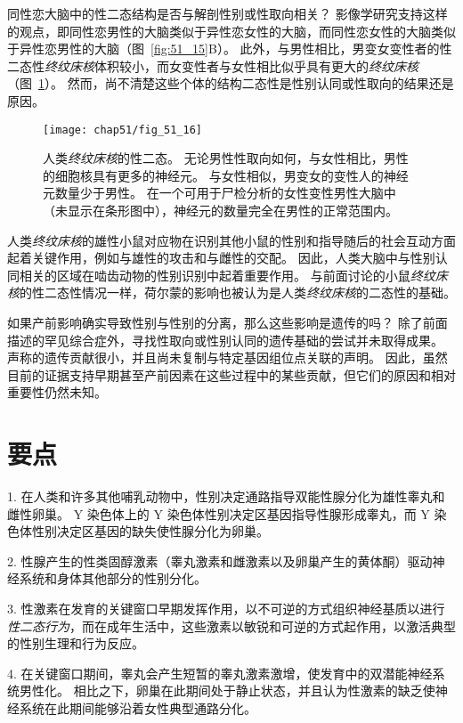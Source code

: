 同性恋大脑中的性二态结构是否与解剖性别或性取向相关？
影像学研究支持这样的观点，即同性恋男性的大脑类似于异性恋女性的大脑，而同性恋女性的大脑类似于异性恋男性的大脑（图~\ref{fig:51_15}B）。
此外，与男性相比，男变女变性者的性二态性\textit{终纹床核}体积较小，而女变性者与女性相比似乎具有更大的\textit{终纹床核}（图~\ref{fig:51_16}）。
然而，尚不清楚这些个体的结构二态性是性别认同或性取向的结果还是原因。


\begin{figure}[htbp]
	\centering
	\texttt{[image: chap51/fig\_51\_16]}
	\caption{人类\textit{终纹床核}的性二态。
		无论男性性取向如何，与女性相比，男性的细胞核具有更多的神经元。
		与女性相似，男变女的变性人的神经元数量少于男性。
		在一个可用于尸检分析的女性变性男性大脑中（未显示在条形图中），神经元的数量完全在男性的正常范围内\cite{kruijver2000male}。}
	\label{fig:51_16}
\end{figure}


人类\textit{终纹床核}的雄性小鼠对应物在识别其他小鼠的性别和指导随后的社会互动方面起着关键作用，例如与雄性的攻击和与雌性的交配。
因此，人类大脑中与性别认同相关的区域在啮齿动物的性别识别中起着重要作用。
与前面讨论的小鼠\textit{终纹床核}的性二态性情况一样，荷尔蒙的影响也被认为是人类\textit{终纹床核}的二态性的基础。


如果产前影响确实导致性别与性别的分离，那么这些影响是遗传的吗？
除了前面描述的罕见综合症外，寻找性取向或性别认同的遗传基础的尝试并未取得成果。
声称的遗传贡献很小，并且尚未复制与特定基因组位点关联的声明。
因此，虽然目前的证据支持早期甚至产前因素在这些过程中的某些贡献，但它们的原因和相对重要性仍然未知。


\section{要点}

1. 在人类和许多其他哺乳动物中，性别决定通路指导双能性腺分化为雄性睾丸和雌性卵巢。
Y 染色体上的 Y 染色体性别决定区基因指导性腺形成睾丸，而 Y 染色体性别决定区基因的缺失使性腺分化为卵巢。


2. 性腺产生的性类固醇激素（睾丸激素和雌激素以及卵巢产生的黄体酮）驱动神经系统和身体其他部分的性别分化。


3. 性激素在发育的关键窗口早期发挥作用，以不可逆的方式组织神经基质以进行\textit{性二态行为}，而在成年生活中，这些激素以敏锐和可逆的方式起作用，以激活典型的性别生理和行为反应。


4. 在关键窗口期间，睾丸会产生短暂的睾丸激素激增，使发育中的双潜能神经系统男性化。
相比之下，卵巢在此期间处于静止状态，并且认为性激素的缺乏使神经系统在此期间能够沿着女性典型通路分化。


